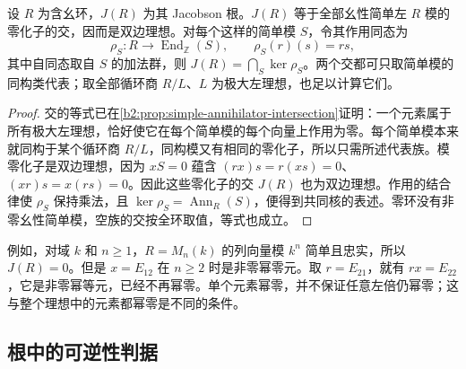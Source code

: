 \begin{proposition}\label{b2:prop:radical-simple-annihilators}
	设 \(R\) 为含幺环，\(J(R)\) 为其 Jacobson 根。\(J(R)\) 等于全部幺性简单左 \(R\) 模的零化子的交，因而是双边理想。对每个这样的简单模 \(S\)，令其作用同态为
	\[
		\rho_S:R\longrightarrow\operatorname{End}_{\mathbb Z}(S), \qquad \rho_S(r)(s)=rs,
	\]
	其中自同态取自 \(S\) 的加法群，则 \(J(R)=\bigcap_S\ker\rho_S\)。两个交都可只取简单模的同构类代表；取全部循环商 \(R/L\)、\(L\) 为极大左理想，也足以计算它们。
\end{proposition}
\begin{proof}
	交的等式已在\cref{b2:prop:simple-annihilator-intersection}证明：一个元素属于所有极大左理想，恰好使它在每个简单模的每个向量上作用为零。每个简单模本来就同构于某个循环商 \(R/L\)，同构模又有相同的零化子，所以只需所述代表族。模零化子是双边理想，因为 \(xS=0\) 蕴含 \((rx)s=r(xs)=0\)、\((xr)s=x(rs)=0\)。因此这些零化子的交 \(J(R)\) 也为双边理想。作用的结合律使 \(\rho_S\) 保持乘法，且 \(\ker\rho_S=\operatorname{Ann}_R(S)\)，便得到共同核的表述。零环没有非零幺性简单模，空族的交按全环取值，等式也成立。
\end{proof}

例如，对域 \(k\) 和 \(n\ge1\)，\(R=M_n(k)\) 的列向量模 \(k^n\) 简单且忠实，所以 \(J(R)=0\)。但是 \(x=E_{12}\) 在 \(n\ge2\) 时是非零幂零元。取 \(r=E_{21}\)，就有 \(rx=E_{22}\)，它是非零幂等元，已经不再幂零。单个元素幂零，并不保证任意左倍仍幂零；这与整个理想中的元素都幂零是不同的条件。

\subsection{根中的可逆性判据}
\label{b2:subsec:1401:02}

